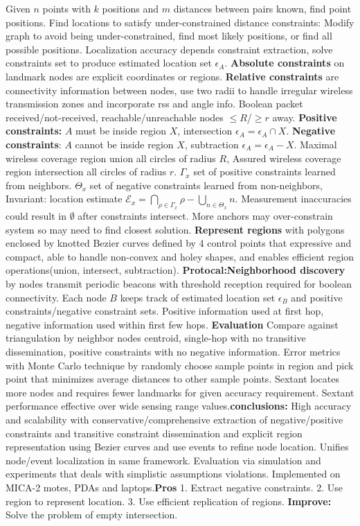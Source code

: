 \documentclass[9pt]{extarticle}
\begin{document}
\begin{multicols}{2}
Given $n$ points with $k$ positions and $m$ distances between pairs known, find point positions. Find locations to satisfy under-constrained distance constraints: Modify graph to avoid being under-constrained, find most likely positions, or find all possible positions. Localization accuracy depends constraint extraction, solve constraints set to produce estimated location set $\epsilon_A$. \textbf{Absolute constraints} on landmark nodes are explicit coordinates or regions. \textbf{Relative constraints} are connectivity information between nodes, use two radii to handle irregular wireless transmission zones and incorporate rss and angle info. Boolean packet received/not-received, reachable/unreachable nodes $\leq{R}$/$\geq{r}$ away. \textbf{Positive constraints:} $A$ must be inside region $X$, intersection $\epsilon_A = \epsilon_A\cap{X}$. \textbf{Negative constraints}: $A$ cannot be inside region $X$, subtraction $\epsilon_A = \epsilon_A-X$. Maximal wireless coverage region union all circles of radius $R$, Assured wireless coverage region intersection all circles of radius $r$. $\Gamma_x$ set of positive constraints learned from neighbors. $\Theta_x$ set of negative constraints learned from non-neighbors, Invariant: location estimate $\mathcal{E}_x= \bigcap_{\rho\in\Gamma_x}\rho-\bigcup_{n\in\Theta_x}n$. Measurement inaccuracies could result in $\emptyset$ after constraints intersect. More anchors may over-constrain system so may need to find closest solution. \textbf{Represent regions} with polygons enclosed by knotted Bezier curves defined by 4 control points that expressive and compact, able to handle non-convex and holey shapes, and enables efficient region operations(union, intersect, subtraction). \textbf{Protocal:}\textbf{Neighborhood discovery} by nodes transmit periodic beacons with threshold reception required for boolean connectivity. Each node $B$ keeps track of estimated location set $\epsilon_B$ and positive constraints/negative constraint sets.  Positive information used at first hop, negative information used within first few hops. \textbf{Evaluation} Compare against triangulation by neighbor nodes centroid, single-hop with no transitive dissemination, positive constraints with no negative information. Error metrics with Monte Carlo technique by randomly choose sample points in region and pick point that minimizes average distances to other sample points. Sextant locates more nodes and requires fewer landmarks for given accuracy requirement. Sextant performance effective over wide sensing range values.\textbf{conclusions:} High accuracy and scalability with conservative/comprehensive extraction of negative/positive constraints and transitive constraint dissemination and explicit region representation using Bezier curves and use events to refine node location. Unifies node/event localization in same framework. Evaluation via simulation and experiments that deals with simplistic assumptions violations. Implemented on MICA-2 motes, PDAs and laptops.\textbf{Pros} 1. Extract negative constraints. 2. Use region to represent location. 3. Use efficient replication of regions. \textbf{Improve:} Solve the problem of empty intersection.


\end{multicols}
\end{document}
